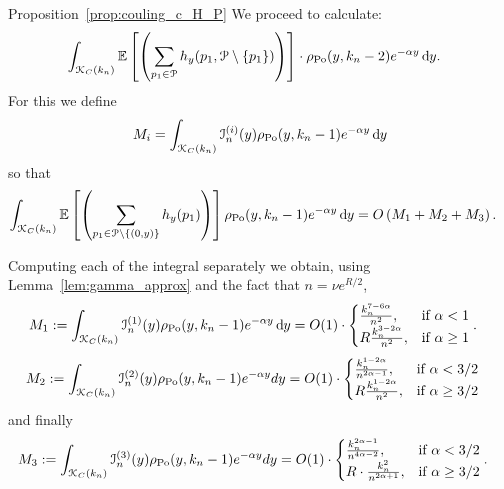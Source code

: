 \begin{proofof}{Proposition~\ref{prop:couling_c_H_P}}
We proceed to calculate:
\begin{align*}
&\int_{{\mathcal K}_{C}(k_n)} \mathbb{E}\left[\left( \sum_{p_1 \in {\mathcal P}} h_y (p_1, {\mathcal P} \setminus \{ p_1 \})\right)\right] \cdot 
 \rho_{{\mathrm{Po}}}(y,k_n-2) e^{-\alpha y} \operatorname{\mathrm{d}\hspace{-2pt}} y.
\end{align*}
For this we define
\[
	M_i = \int_{{\mathcal K}_{C}(k_n)} \mathcal{I}_n^{(i)}(y) \rho_{{\mathrm{Po}}}(y,k_n-1) e^{-\alpha y} \operatorname{\mathrm{d}\hspace{-2pt}} y
\]
so that
\begin{align*}
\int_{{\mathcal K}_{C}(k_n)} \mathbb{E}\left[\left( \sum_{p_1 \in {\mathcal P} \setminus \{(0,y)\}} h_y (p_1)\right)\right] \rho_{{\mathrm{Po}}}(y,k_n-1) e^{-\alpha y} \operatorname{\mathrm{d}\hspace{-2pt}} y
&= O\left(M_1 + M_2 + M_3\right).
\end{align*}

Computing each of the integral separately we obtain, using Lemma~\ref{lem:gamma_approx} and the fact that $n = \nu e^{R/2}$,
\begin{align*} 
M_1:= \int_{{\mathcal K}_{C}(k_n)} \mathcal{I}_n^{(1)}(y) \rho_{{\mathrm{Po}}}(y,k_n-1) e^{-\alpha y} \operatorname{\mathrm{d}\hspace{-2pt}} y
&= O(1) \cdot 
\begin{cases} 
	\frac{k_n^{7-6\alpha}}{n^2}, & \mbox{if $\alpha <1$} \\
	R \frac{k_n^{3-2\alpha}}{n^2}, & \mbox{if $\alpha \geq 1$}
\end{cases}. 
\end{align*}
\begin{align*} 
M_2:= \int_{{\mathcal K}_{C}(k_n)} \mathcal{I}_n^{(2)}(y) \rho_{{\mathrm{Po}}}(y,k_n-1) e^{-\alpha y} dy
&= O(1) \cdot 
\begin{cases}
\frac{k_n^{1-2\alpha}}{n^{2\alpha-1}}, & \mbox{if $\alpha < 3/2$} \\
R   \frac{k_n^{1-2\alpha}}{n^{2}}, & \mbox{if $\alpha \geq 3/2$}
\end{cases}
\end{align*}
and finally 
\begin{align*} 
M_3:= \int_{{\mathcal K}_{C}(k_n)} \mathcal{I}_n^{(3)}(y) \rho_{{\mathrm{Po}}}(y,k_n-1) e^{-\alpha y} dy
&= O(1) \cdot 
\begin{cases} 
\frac{k_n^{2\alpha - 1}}{n^{4\alpha -2}}, & \mbox{if $\alpha <3/2$} \\ 
R \cdot \frac{k_n^2}{n^{2\alpha+1}}, &\mbox{if $\alpha \geq 3/2$}
\end{cases}  .
\end{align*}


\end{proofof}
